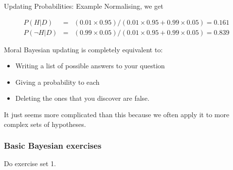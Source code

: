 \documentclass{beamer}
\begin{document}
\begin{frame}[t]{Updating Probabilities: Example}
Normalising, we get

\begin{eqnarray*}
P(H | D) &=& (0.01 \times 0.95)/(0.01 \times 0.95 + 0.99\times0.05) = 0.161\\
P(\neg H | D) &=& (0.99 \times 0.05)/(0.01 \times 0.95 + 0.99\times0.05) = 0.839
\end{eqnarray*}
\end{frame}

\begin{frame}[t]{Moral}
Bayesian updating is completely equivalent to:
\begin{itemize}
\item Writing a list of possible answers to your question
\item Giving a probability to each
\item Deleting the ones that you discover are false.
\end{itemize}

It just seems more complicated than this because we often apply it to more
complex sets of hypotheses.
\end{frame}


\begin{frame}
\frametitle{Basic Bayesian exercises}

Do exercise set 1.

\end{frame}
\end{document}

